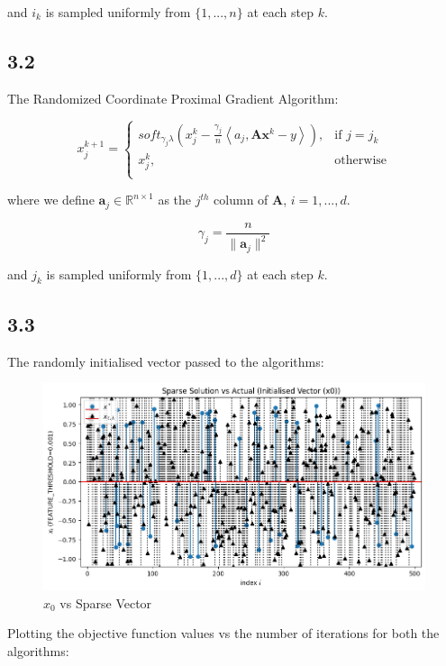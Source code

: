 \documentclass[12pt]{article}
\begin{document}
and $i_k$ is sampled uniformly from $\{1, ..., n\}$ at each step $k$.

\subsection*{3.2}

The Randomized Coordinate Proximal Gradient Algorithm:

\[x_j^{k+1} = \begin{cases}
      soft_{\gamma_j \lambda}(x_j^k - \frac{\gamma_j}{n} \left\langle a_j, \textbf{A} \textbf{x}^k - y\right\rangle), & \text{if } j = j_k \\
      x_j^k, & \text{otherwise} \\
   \end{cases}
\]

where we define $\textbf{a}_j \in \mathbb{R}^{n \times 1}$ as the $j^{th}$ column of $\textbf{A}$, $i=1, ..., d$.

\[\gamma_j = \frac{n}{\|\textbf{a}_j\|^2}\]

and $j_k$ is sampled uniformly from $\{1, ..., d\}$ at each step $k$.

\newpage
\subsection*{3.3}

The randomly initialised vector passed to the algorithms:

\begin{figure}[h]
\centering
\includegraphics[scale=0.35]{outputs/part_3/initial-x}
\caption{$x_0$ vs Sparse Vector}
\label{fig:}
\end{figure}

Plotting the objective function values vs the number of iterations for both the algorithms:
\end{document}
